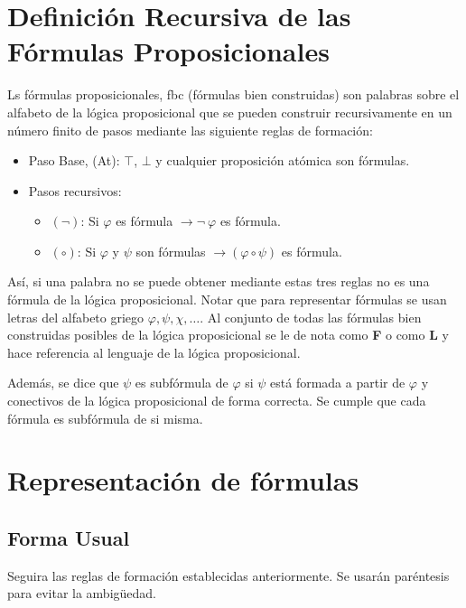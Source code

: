 \documentclass[10pt,a4paper]{article}
\begin{document}
\section{Definición Recursiva de las Fórmulas Proposicionales}
Ls fórmulas proposicionales, fbc (fórmulas bien construidas) son palabras sobre el alfabeto de la lógica proposicional que se pueden construir recursivamente en un número finito de pasos mediante las siguiente reglas de formación:
\begin{itemize}
	\item Paso Base, (At): $\top$, $\bot$ y cualquier proposición atómica son fórmulas.
	\item Pasos recursivos:
		\begin{itemize}
			\item $(\neg)$: Si $\varphi$ es fórmula $\rightarrow\neg\:\varphi$ es fórmula.
			\item $(\circ)$: Si $\varphi$ y $\psi$ son fórmulas $\rightarrow(\varphi\circ\psi)$ es fórmula.
		\end{itemize}
\end{itemize}
Así, si una palabra no se puede obtener mediante estas tres reglas no es una fórmula de la lógica proposicional. Notar que para representar fórmulas se usan letras del alfabeto griego $\varphi, \psi, \chi,\dots$. Al conjunto de todas las fórmulas bien construidas posibles de la lógica proposicional se le de nota como \textbf{F} o como \textbf{L} y hace referencia al lenguaje de la lógica proposicional.

Además, se dice que $\psi$ es subfórmula de $\varphi$ si $\psi$ está formada a partir de $\varphi$ y conectivos de la lógica proposicional de forma correcta. Se cumple que cada fórmula es subfórmula de si misma.

\section{Representación de fórmulas}

\subsection{Forma Usual} 
Seguira las reglas de formación establecidas anteriormente. Se usarán paréntesis para evitar la ambigüedad.
\end{document}

